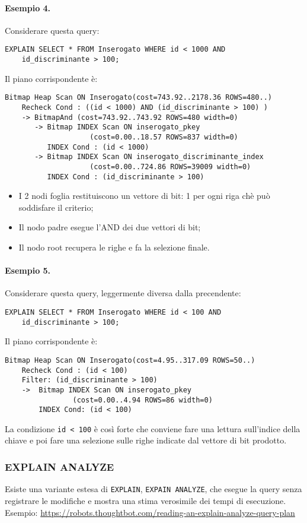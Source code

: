 \documentclass[a4paper, 10pt, titlepage]{article}
\begin{document}
\paragraph{Esempio 4.}
		Considerare questa query:
	\begin{lstlisting}
EXPLAIN SELECT * FROM Inserogato WHERE id < 1000 AND
	id_discriminante > 100;
	\end{lstlisting}
	Il piano corrispondente è:
	\begin{lstlisting}
Bitmap Heap Scan ON Inserogato(cost=743.92..2178.36 ROWS=480..)
	Recheck Cond : ((id < 1000) AND (id_discriminante > 100) )
	-> BitmapAnd (cost=743.92..743.92 ROWS=480 width=0)
	   -> Bitmap INDEX Scan ON inserogato_pkey
					(cost=0.00..18.57 ROWS=837 width=0)
		  INDEX Cond : (id < 1000)
	   -> Bitmap INDEX Scan ON inserogato_discriminante_index
					(cost=0.00..724.86 ROWS=39009 width=0)
		  INDEX Cond : (id_discriminante > 100)
	\end{lstlisting}
	\begin{itemize}
	\item I 2 nodi foglia restituiscono un vettore di bit: 1 per ogni riga chè può soddisfare il criterio;
	\item Il nodo padre esegue l'AND dei due vettori di bit;
	\item Il nodo root recupera le righe e fa la selezione finale.
	\end{itemize}  
	
	\paragraph{Esempio 5.}
		Considerare questa query, leggermente diversa dalla precendente:
	\begin{lstlisting}
EXPLAIN SELECT * FROM Inserogato WHERE id < 100 AND
	id_discriminante > 100;
	\end{lstlisting}
	Il piano corrispondente è:
	\begin{lstlisting}
Bitmap Heap Scan ON Inserogato(cost=4.95..317.09 ROWS=50..)
	Recheck Cond : (id < 100) 
	Filter: (id_discriminante > 100)
	->  Bitmap INDEX Scan ON inserogato_pkey 
				(cost=0.00..4.94 ROWS=86 width=0)
		INDEX Cond: (id < 100)
	\end{lstlisting} \medskip
	La condizione \lstinline|id < 100| è così forte che conviene fare una lettura sull’indice della chiave e poi fare una selezione sulle righe indicate dal vettore di bit prodotto.
	  
	
	\subsubsection*{EXPLAIN ANALYZE}
	Esiste una variante estesa di \lstinline|EXPLAIN|, \lstinline|EXPAIN ANALYZE|, che esegue la query senza registrare le modifiche e mostra una stima verosimile dei tempi di esecuzione.\\
	Esempio:
	\url{https://robots.thoughtbot.com/reading-an-explain-analyze-query-plan}
\end{document}
